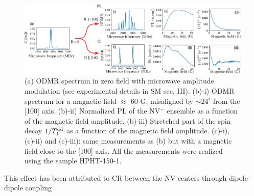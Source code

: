 \documentclass[preprintnumbers,amsmath,amssymb,superscriptaddress,twocolumn,showpacs]{revtex4-2}
\begin{document}
\begin{figure}
\includegraphics[width=.95\textwidth]{fig_100_vs_1x1x1x1.pdf}
\caption{(a) ODMR spectrum in zero field with microwave amplitude modulation (see experimental details in SM sec. III). (b)-i) ODMR spectrum for a magnetic field $\approx$ 60 G, misaligned by $\sim  24^\circ$ from the [100] axis. (b)-ii) Normalized PL of the NV$^-$ ensemble as a function of the magnetic field amplitude. (b)-iii) Stretched part of the spin decay $1/T_1^{\rm dd}$ as a function of the magnetic field amplitude. (c)-i), (c)-ii) and (c)-iii): same measurements as (b) but with a magnetic field close to the [100] axis. All the measurements were realized using the sample HPHT-150-1.}
\label{100_VS_1x4}
\end{figure}
This effect has been attributed to CR between the NV centers through dipole-dipole coupling \citep{mrozek_longitudinal_2015, choi2017depolarization}. 
\end{document}
